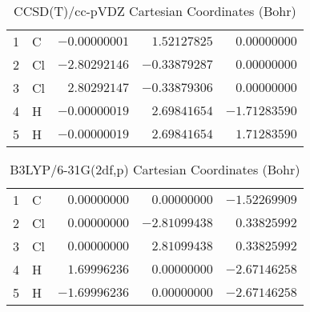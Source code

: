 \documentclass[10pt,oneside]{article}
\begin{document}
\begin{table}[h!]
\centering
\caption{CCSD(T)/cc-pVDZ Cartesian Coordinates (Bohr)}
\begin{tabular}{llrrr}
1  & C  & $-0.00000001$ & $ 1.52127825$ & $ 0.00000000$ \\
2  & Cl & $-2.80292146$ & $-0.33879287$ & $ 0.00000000$ \\
3  & Cl & $ 2.80292147$ & $-0.33879306$ & $ 0.00000000$ \\
4  & H  & $-0.00000019$ & $ 2.69841654$ & $-1.71283590$ \\
5  & H  & $-0.00000019$ & $ 2.69841654$ & $ 1.71283590$ \\
\end{tabular}
\end{table}

\begin{table}[h!]
\centering
\caption{B3LYP/6-31G(2df,p) Cartesian Coordinates (Bohr)}
\begin{tabular}{llrrr}
1  & C  & $ 0.00000000$ & $ 0.00000000$ & $-1.52269909$ \\
2  & Cl & $ 0.00000000$ & $-2.81099438$ & $ 0.33825992$ \\
3  & Cl & $ 0.00000000$ & $ 2.81099438$ & $ 0.33825992$ \\
4  & H  & $ 1.69996236$ & $ 0.00000000$ & $-2.67146258$ \\
5  & H  & $-1.69996236$ & $ 0.00000000$ & $-2.67146258$ \\
\end{tabular}
\end{table}

\clearpage
\end{document}
